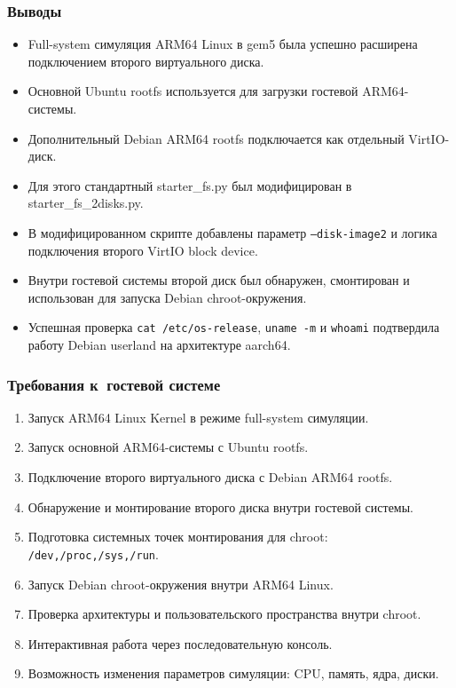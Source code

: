 \documentclass{beamer}
\begin{document}
\begin{frame}[shrink=5]
\frametitle{Выводы}
\begin{itemize}
    \item Full-system симуляция ARM64 Linux в gem5 была успешно расширена подключением второго виртуального диска.
    \item Основной Ubuntu rootfs используется для загрузки гостевой ARM64-системы.
    \item Дополнительный Debian ARM64 rootfs подключается как отдельный VirtIO-диск.
    \item Для этого стандартный starter\_fs.py был модифицирован в starter\_fs\_2disks.py.
    \item В модифицированном скрипте добавлены параметр \texttt{--disk-image2} и логика подключения второго VirtIO block device.
    \item Внутри гостевой системы второй диск был обнаружен, смонтирован и использован для запуска Debian chroot-окружения.
    \item Успешная проверка \texttt{cat /etc/os-release}, \texttt{uname -m} и \texttt{whoami} подтвердила работу Debian userland на архитектуре aarch64.
\end{itemize}
\end{frame}

\begin{frame}[shrink=5]
\frametitle{Требования к~гостевой системе}
\begin{enumerate}
    \item Запуск ARM64 Linux Kernel в режиме full-system симуляции.
    \item Запуск основной ARM64-системы с Ubuntu rootfs.
    \item Подключение второго виртуального диска с Debian ARM64 rootfs.
    \item Обнаружение и монтирование второго диска внутри гостевой системы.
    \item Подготовка системных точек монтирования для chroot: \texttt{/dev,/proc,/sys,/run}.
    \item Запуск Debian chroot-окружения внутри ARM64 Linux.
    \item Проверка архитектуры и пользовательского пространства внутри chroot.
    \item Интерактивная работа через последовательную консоль.
    \item Возможность изменения параметров симуляции: CPU, память, ядра, диски.
\end{enumerate}
\end{frame}
\end{document}
